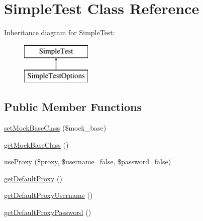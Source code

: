 \hypertarget{class_simple_test}{
\section{SimpleTest Class Reference}
\label{class_simple_test}
}
Inheritance diagram for SimpleTest:\begin{figure}[H]
\begin{center}
\leavevmode
\includegraphics[height=2.000000cm]{class_simple_test}
\end{center}
\end{figure}
\subsection*{Public Member Functions}
\begin{DoxyCompactItemize}
\item 
\hyperlink{class_simple_test_a6bfdc0adde3e11f041872bbacd773fdf}{setMockBaseClass} (\$mock\_\-base)
\item 
\hyperlink{class_simple_test_a570025ed110ef875fa426e67acfbd326}{getMockBaseClass} ()
\item 
\hyperlink{class_simple_test_a40777a990732860c647bea8c7aa7f753}{useProxy} (\$proxy, \$username=false, \$password=false)
\item 
\hyperlink{class_simple_test_ad365479a7b328142767560e440f1f2c0}{getDefaultProxy} ()
\item 
\hyperlink{class_simple_test_aabcb9a6457417c17e297d95ca9a1a1db}{getDefaultProxyUsername} ()
\item 
\hyperlink{class_simple_test_a2624d0e6c9d79700b03600fca215e642}{getDefaultProxyPassword} ()
\end{DoxyCompactItemize}
